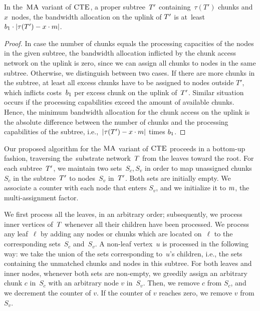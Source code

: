 

\begin{lemma}\label{lem:uplink-alloc}
In the~$\textsc{MA}$ variant of $\textsc{CTE}$, a proper subtree~$T'$
containing~$\tau(T')$
chunks and $x$~nodes, the bandwidth allocation on the uplink of $T'$ is at~least ${b_1\cdot|\tau(T')-x\cdot m|}$.
\label{lemma:uplink}
\end{lemma}
\begin{proof}
In case the number of chunks equals the processing capacities of the
nodes in the given subtree,
the bandwidth allocation inflicted by the chunk access network on the uplink is zero, since we can assign all chunks to nodes in the same subtree.
Otherwise, we distinguish between two cases. If there are more chunks in the subtree, at least all excess chunks have to
be assigned to nodes outside $T'$, which 
inflicts costs~$b_1$ per excess chunk on the uplink of~$T'$.
 Similar situation occurs if the processing capabilities exceed the
amount of
available chunks.
Hence, the minimum bandwidth allocation for the chunk access on the uplink
is the absolute difference between the number of chunks and the processing capabilities
of the subtree, i.e.,~$|\tau(T')-x\cdot m|$ times $b_1$.
\end{proof}


 Our proposed algorithm for the $\textsc{MA}$ variant of $\textsc{CTE}$
proceeds in a bottom-up fashion, traversing the~substrate network~$T$
from the leaves toward the root.
For each subtree~$T'$, we maintain
two sets~$S_c,S_v$ in order to map unassigned
chunks~$S_c$ in the subtree~$T'$ to 
nodes~$S_v$ in~$T'$. Both sets are initially empty.
We associate a counter with each node that enters $S_v$, and we initialize it to $m$, the multi-assignment factor.


We first process all the leaves, in an arbitrary order; subsequently, we process inner vertices
of~$T$ whenever all their children have been processed.
We process any leaf~$\ell$
by adding any
nodes or chunks which are located on~$\ell$ to the corresponding sets~$S_c$ and~$S_v$.
A non-leaf vertex~$u$ is processed in the following way: we take the union of
the sets corresponding to~$u$'s children, i.e., the sets containing the unmatched chunks and nodes
in this subtree.
For both leaves and inner nodes, whenever
both sets are non-empty, we greedily assign an arbitrary chunk $c$ in~$S_c$ with an arbitrary node $v$ in~$S_v$.
Then, we remove $c$ from $S_c$, and we decrement the counter of $v$. If the counter of $v$ reaches zero, we remove $v$ from $S_v$.

